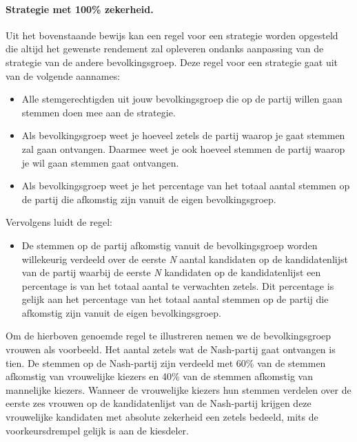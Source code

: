 \paragraph{Strategie met 100\% zekerheid.}
Uit het bovenstaande bewijs kan een regel voor een strategie worden opgesteld die altijd het gewenste rendement zal opleveren ondanks aanpassing van de strategie van de andere bevolkingsgroep. Deze regel voor een strategie gaat uit van de volgende aannames:\\
\begin{itemize}
\item
Alle stemgerechtigden uit jouw bevolkingsgroep die op de partij willen gaan stemmen doen mee aan de strategie.
\item 
Als bevolkingsgroep weet je hoeveel zetels de partij waarop je gaat stemmen zal gaan ontvangen. Daarmee weet je ook hoeveel stemmen de partij waarop je wil gaan stemmen gaat ontvangen.
\item 
Als bevolkingsgroep weet je het percentage van het totaal aantal stemmen op de partij die afkomstig zijn vanuit de eigen bevolkingsgroep.
\end{itemize}

\noindent Vervolgens luidt de regel: 
\begin{itemize}
\item
De stemmen op de partij afkomstig vanuit de bevolkingsgroep worden willekeurig verdeeld over de eerste \textit{N} aantal kandidaten op de kandidatenlijst van de partij waarbij de eerste \textit{N} kandidaten op de kandidatenlijst een percentage is van het totaal aantal te verwachten zetels. Dit percentage is gelijk aan het percentage van het totaal aantal stemmen op de partij die afkomstig zijn vanuit de eigen bevolkingsgroep.
\end{itemize}

Om de hierboven genoemde regel te illustreren nemen we de bevolkingsgroep vrouwen als voorbeeld. Het aantal zetels wat de Nash-partij gaat ontvangen is tien. De stemmen op de Nash-partij zijn verdeeld met 60\% van de stemmen afkomstig van vrouwelijke kiezers en 40\% van de stemmen afkomstig van mannelijke kiezers. Wanneer de vrouwelijke kiezers hun stemmen verdelen over de eerste zes vrouwen op de kandidatenlijst van de Nash-partij krijgen deze vrouwelijke kandidaten met absolute zekerheid een zetels bedeeld, mits de voorkeursdrempel gelijk is aan de kiesdeler. 
